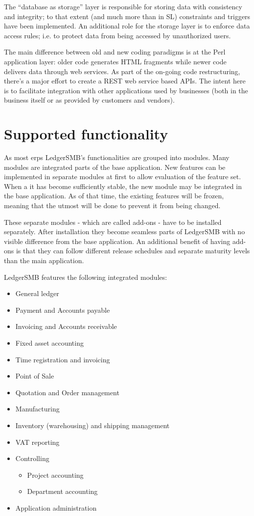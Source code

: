 The ``database as storage'' layer is responsible for storing data with consistency and
integrity; to that extent (and much more than in \acrshort{SL}) constraints and triggers
have been implemented.  An additional role for the storage layer is to enforce data
access rules; i.e. to protect data from being accessed by unauthorized users.

The main difference between old and new coding paradigms is at the Perl application
layer: older code generates HTML fragments while newer code delivers data through
web services.  As part of the on-going code restructuring, there's a major effort
to create a \gls{REST} web service based APIs.  The intent here is to facilitate
integration with other applications used by businesses (both in the business itself
or as provided by customers and vendors).



\section{Supported functionality}
\label{sec-ledgersmb-modules}
As most \glspl{erp} LedgerSMB's functionalities are grouped into modules.
Many modules are integrated parts of the base application.  New features
can be implemented in separate modules at first to allow evaluation of the
feature set.  When a it has become sufficiently stable, the new module may
be integrated in the base application. As of that time, the existing features
will be frozen, meaning that the utmost will be done to prevent it from being
changed.

These separate modules - which are called \glspl{add-on} - have to be
installed separately.  After installation they become seamless parts of
LedgerSMB with no visible difference from the base application. An
additional benefit of having \glspl{add-on} is that they can follow different
release schedules and separate maturity levels than the main application.


LedgerSMB \ledgerSMBversion features the following integrated modules:

\begin{itemize}
\item General ledger
\item Payment and Accounts payable
\item Invoicing and Accounts receivable
\item Fixed asset accounting
\item Time registration and invoicing
\item Point of Sale
\item Quotation and Order management
\item Manufacturing
\item Inventory (warehousing) and shipping management
\item VAT reporting
\item Controlling
\begin{itemize}
\item Project accounting
\item Department accounting
\end{itemize}
\item Application administration
\end{itemize}

